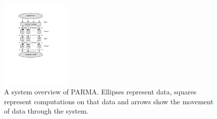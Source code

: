 \begin{figure}[htb]
\centering
\includegraphics[width=0.3\textwidth]{parma/overview.pdf}
\caption{A system overview of PARMA. Ellipses represent data, squares represent
computations on that data and arrows show the movement of data through the
system.}
\label{fig:parmaoverview}
\end{figure}

